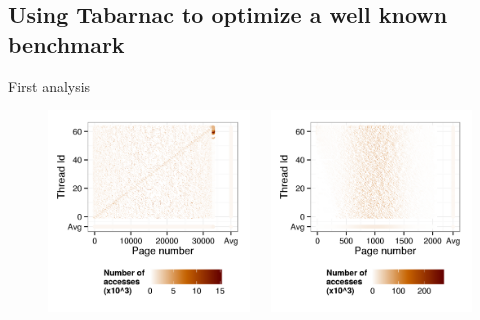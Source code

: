 \documentclass[xcolor={usenames,dvipsnames},hyperref={pdfusetitle}]{beamer}
\begin{document}
\subsection{Using Tabarnac to optimize a well known benchmark}

\begin{frame}{First analysis}
\begin{figure}[htb]
    \begin{columns}
        \begin{column}{.45\linewidth}
            \includegraphics[width=\linewidth]  {tabarnac/is_b_kb2_orig}
        \end{column}
        \begin{column}{.45\linewidth}
            \includegraphics[width=\linewidth]  {tabarnac/is_b_kb1_orig}

\end{column}
\end{columns}
\end{figure}
\end{frame}
\end{document}
